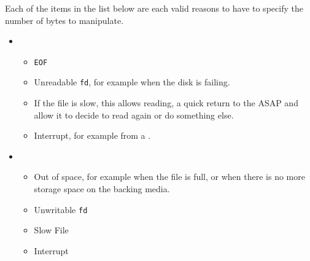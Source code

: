 Each of the items in the list below are each valid reasons to have to specify the number of bytes to manipulate.
\begin{itemize}
\item {}
  \begin{itemize}
  \item \texttt{EOF}
  \item Unreadable \texttt{fd}, for example when the disk is failing.
  \item If the file is slow, this allows reading, a quick return to the  ASAP and allow it to decide to read again or do something else.
  \item Interrupt, for example from a .
  \end{itemize}
\item {}
  \begin{itemize}
  \item Out of space, for example when the file is full, or when there is no more storage space on the backing media.
  \item Unwritable \texttt{fd}
  \item Slow File
  \item Interrupt
  \end{itemize}
\end{itemize}

